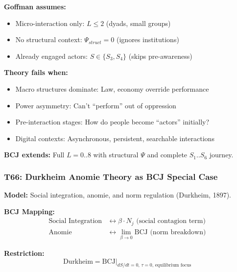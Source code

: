 \begin{tcolorbox}[colback=red!5!white, colframe=red!75!black,
    title=Boundary Condition: Where Goffman Fails]
\textbf{Goffman assumes:}
\begin{itemize}[nosep]
\item Micro-interaction only: $L \leq 2$ (dyads, small groups)
\item No structural context: $\Psi_{struct} = 0$ (ignores institutions)
\item Already engaged actors: $S \in \{S_3, S_4\}$ (skips pre-awareness)
\end{itemize}

\textbf{Theory fails when:}
\begin{itemize}[nosep]
\item Macro structures dominate: Law, economy override performance
\item Power asymmetry: Can't ``perform'' out of oppression
\item Pre-interaction stages: How do people become ``actors'' initially?
\item Digital contexts: Asynchronous, persistent, searchable interactions
\end{itemize}

\textbf{BCJ extends:} Full $L = 0..8$ with structural $\Psi$ and complete $S_1..S_6$ journey.
\end{tcolorbox}

\subsubsection*{T66: Durkheim Anomie Theory as BCJ Special Case}

\textbf{Model:} Social integration, anomie, and norm regulation (Durkheim, 1897).

\textbf{BCJ Mapping:}
\begin{align}
\text{Social Integration} &\leftrightarrow \beta \cdot N_j \text{ (social contagion term)} \\
\text{Anomie} &\leftrightarrow \lim_{\beta \to 0} \text{BCJ} \text{ (norm breakdown)}
\end{align}

\textbf{Restriction:}
\begin{equation}
\text{Durkheim} = \text{BCJ} \big|_{dS/dt = 0, \, \tau = 0, \, \text{equilibrium focus}}
\end{equation}

